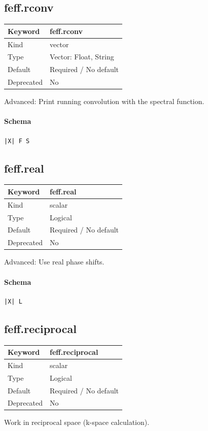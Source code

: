 \documentclass[11pt]{article}
\begin{document}
{{{{\subsection{feff.rconv}
\label{kw:feff-rconv}
\begin{longtable}{|p{1.5in}|p{4.5in}|}
\hline
Keyword & feff.rconv \\
\hline
Kind & vector \\
\hline
Type & Vector: Float, String \\
\hline
Default & Required / No default \\
\hline
Deprecated & No \\
\hline
\end{longtable}
 Advanced: Print running convolution with the spectral function.

\paragraph{Schema}
\begin{Verbatim}
|X| F S
\end{Verbatim}

\subsection{feff.real}
\label{kw:feff-real}
\begin{longtable}{|p{1.5in}|p{4.5in}|}
\hline
Keyword & feff.real \\
\hline
Kind & scalar \\
\hline
Type & Logical \\
\hline
Default & Required / No default \\
\hline
Deprecated & No \\
\hline
\end{longtable}
 Advanced: Use real phase shifts.

\paragraph{Schema}
\begin{Verbatim}
|X| L
\end{Verbatim}

\subsection{feff.reciprocal}
\label{kw:feff-reciprocal}
\begin{longtable}{|p{1.5in}|p{4.5in}|}
\hline
Keyword & feff.reciprocal \\
\hline
Kind & scalar \\
\hline
Type & Logical \\
\hline
Default & Required / No default \\
\hline
Deprecated & No \\
\hline
\end{longtable}
 Work in reciprocal space (k-space calculation).

}}}}
\end{document}

